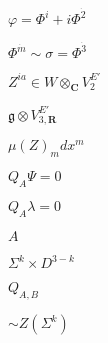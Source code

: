 \setlength{\textwidth}{0.6\paperwidth}



\setlength\abovedisplayskip{0pt} %


\begin{preview}
\setcounter{equation}{0}%
\( \varphi = \Phi^i + i \Phi ^{\dot{2}} \)
\end{preview}

\begin{preview}
\setcounter{equation}{0}%
\( \Phi^{ \dot{m}} \sim \sigma = \Phi^{\dot{3}} \)
\end{preview}

\begin{preview}
\setcounter{equation}{0}%
\( Z^{i a}\in W \otimes _{\mathbf{C}} V_2^{E'} \)
\end{preview}

\begin{preview}
\setcounter{equation}{0}%
\(\mathfrak{g} \otimes  V_{3, \mathbf{R}}^{E'} \)
\end{preview}

\begin{preview}
\setcounter{equation}{0}%
\( \mu(Z)_m dx^m\)
\end{preview}

\begin{preview}
\setcounter{equation}{0}%
\( Q_A\Psi =0 \)
\end{preview}

\begin{preview}
\setcounter{equation}{0}%
\( Q_A \lambda =0 \)
\end{preview}

\begin{preview}
\setcounter{equation}{0}%
\( A \)
\end{preview}

\begin{preview}
\setcounter{equation}{0}%
\( \Sigma^k \times D^{3-k} \)
\end{preview}

\begin{preview}
\setcounter{equation}{0}%
\( Q_{A,B} \)
\end{preview}

\begin{preview}
\setcounter{equation}{0}%
\( \sim Z(\Sigma^k) \)
\end{preview}

